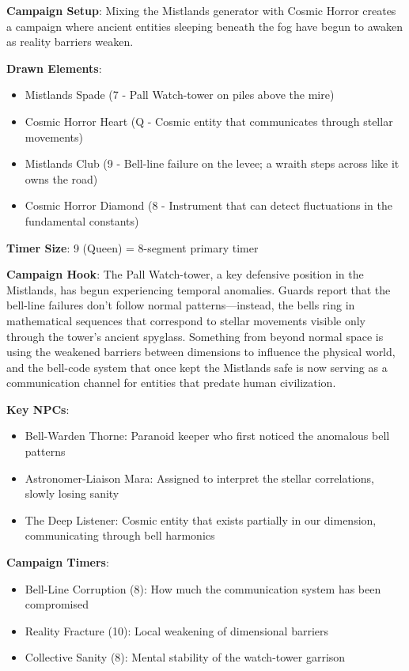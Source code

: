 \documentclass[11pt]{article}
\begin{document}
\begin{mdframed}[backgroundcolor=horrorbg]
\textbf{Campaign Setup}:
Mixing the Mistlands generator with Cosmic Horror creates a campaign where ancient entities sleeping beneath the fog have begun to awaken as reality barriers weaken.

\textbf{Drawn Elements}:
\begin{itemize}[leftmargin=*]
\item Mistlands Spade (7 - Pall Watch-tower on piles above the mire)
\item Cosmic Horror Heart (Q - Cosmic entity that communicates through stellar movements)
\item Mistlands Club (9 - Bell-line failure on the levee; a wraith steps across like it owns the road)
\item Cosmic Horror Diamond (8 - Instrument that can detect fluctuations in the fundamental constants)
\end{itemize}

\textbf{Timer Size}: 9 (Queen) = 8-segment primary timer

\textbf{Campaign Hook}:
The Pall Watch-tower, a key defensive position in the Mistlands, has begun experiencing temporal anomalies. Guards report that the bell-line failures don't follow normal patterns---instead, the bells ring in mathematical sequences that correspond to stellar movements visible only through the tower's ancient spyglass. Something from beyond normal space is using the weakened barriers between dimensions to influence the physical world, and the bell-code system that once kept the Mistlands safe is now serving as a communication channel for entities that predate human civilization.

\textbf{Key NPCs}:
\begin{itemize}[leftmargin=*]
\item Bell-Warden Thorne: Paranoid keeper who first noticed the anomalous bell patterns
\item Astronomer-Liaison Mara: Assigned to interpret the stellar correlations, slowly losing sanity
\item The Deep Listener: Cosmic entity that exists partially in our dimension, communicating through bell harmonics
\end{itemize}

\textbf{Campaign Timers}:
\begin{itemize}[leftmargin=*]
\item Bell-Line Corruption (8): How much the communication system has been compromised
\item Reality Fracture (10): Local weakening of dimensional barriers
\item Collective Sanity (8): Mental stability of the watch-tower garrison
\end{itemize}


\end{mdframed}
\end{document}
